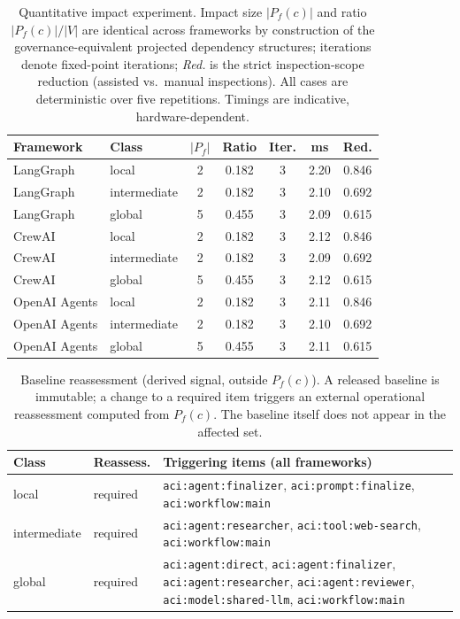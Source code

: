 \documentclass[10pt]{article}
\begin{document}
\begin{table}[htbp]
	\centering
	\caption{Quantitative impact experiment. Impact size $|P_f(c)|$ and
		ratio $|P_f(c)|/|V|$ are identical across frameworks by construction of
		the governance-equivalent projected dependency structures; iterations
		denote fixed-point iterations; \emph{Red.} is the strict inspection-scope
		reduction (assisted vs.\ manual inspections). All cases are deterministic
		over five repetitions. Timings are indicative, hardware-dependent.}
	\label{tab:app-impact-quantitative}
	\small
	\begin{tabular}{@{}llccccc@{}}
		\toprule
		\textbf{Framework} & \textbf{Class} & \textbf{$|P_f|$} & \textbf{Ratio} & \textbf{Iter.} & \textbf{ms} & \textbf{Red.} \\
		\midrule
		LangGraph      & local        & 2 & 0.182 & 3 & 2.20 & 0.846 \\
		LangGraph      & intermediate & 2 & 0.182 & 3 & 2.10 & 0.692 \\
		LangGraph      & global       & 5 & 0.455 & 3 & 2.09 & 0.615 \\
		\midrule
		CrewAI         & local        & 2 & 0.182 & 3 & 2.12 & 0.846 \\
		CrewAI         & intermediate & 2 & 0.182 & 3 & 2.09 & 0.692 \\
		CrewAI         & global       & 5 & 0.455 & 3 & 2.12 & 0.615 \\
		\midrule
		OpenAI Agents  & local        & 2 & 0.182 & 3 & 2.11 & 0.846 \\
		OpenAI Agents  & intermediate & 2 & 0.182 & 3 & 2.10 & 0.692 \\
		OpenAI Agents  & global       & 5 & 0.455 & 3 & 2.11 & 0.615 \\
		\bottomrule
	\end{tabular}
\end{table}

\begin{table}[htbp]
	\centering
	\caption{Baseline reassessment (derived signal, outside $P_f(c)$). A
		released baseline is immutable; a change to a required item triggers an
		external operational reassessment computed from $P_f(c)$. The baseline
		itself does not appear in the affected set.}
	\label{tab:app-impact-reassessment}
	\small
	\begin{tabularx}{\columnwidth}{@{}llX@{}}
		\toprule
		\textbf{Class} & \textbf{Reassess.} & \textbf{Triggering items (all frameworks)} \\
		\midrule
		local & required &
		\texttt{aci:agent:finalizer}, \texttt{aci:prompt:finalize},
		\texttt{aci:workflow:main} \\
		intermediate & required &
		\texttt{aci:agent:researcher}, \texttt{aci:tool:web-search},
		\texttt{aci:workflow:main} \\
		global & required &
		\texttt{aci:agent:direct}, \texttt{aci:agent:finalizer},
		\texttt{aci:agent:researcher}, \texttt{aci:agent:reviewer},
		\texttt{aci:model:shared-llm}, \texttt{aci:workflow:main} \\
		\bottomrule
	\end{tabularx}
\end{table}
\end{document}
